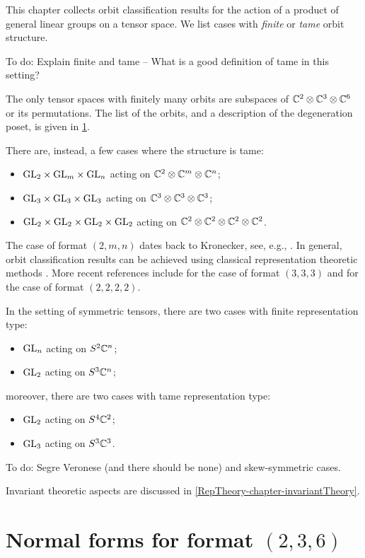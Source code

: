 This chapter collects orbit classification results for the action of a product of general linear groups on a tensor space. We list cases with \emph{finite} or \emph{tame} orbit structure.

To do: Explain finite and tame -- What is a good definition of tame in this setting?

The only tensor spaces with finitely many orbits are subspaces of $\mathbb{C}^2 \otimes \mathbb{C}^3 \otimes \mathbb{C}^6$ or its permutations. The list of the orbits, and a description of the degeneration poset, is given in \ref{RepTheory-orbitclassification-section-236}.

There are, instead, a few cases where the structure is tame:
\begin{itemize}
 \item $\mathrm{GL}_2 \times \mathrm{GL}_m \times \mathrm{GL}_n$ acting on $\mathbb{C}^2 \otimes \mathbb{C}^m \otimes \mathbb{C}^n$;
 \item $\mathrm{GL}_3 \times \mathrm{GL}_3 \times \mathrm{GL}_3$ acting on $\mathbb{C}^3 \otimes \mathbb{C}^3 \otimes \mathbb{C}^3$;
 \item $\mathrm{GL}_2 \times \mathrm{GL}_2 \times \mathrm{GL}_2 \times \mathrm{GL}_2$ acting on $\mathbb{C}^2 \otimes \mathbb{C}^2 \otimes \mathbb{C}^2 \otimes \mathbb{C}^2$.
\end{itemize}
The case of format $(2,m,n)$ dates back to Kronecker, see, e.g., \cite[Ch.XIII]{Gan59}. In general, orbit classification results can be achieved using classical representation theoretic methods \cite{Vin79}. More recent references include \cite{Nur00} for the case of format $(3,3,3)$ and \cite{CD12} for the case of format $(2,2,2,2)$.

In the setting of symmetric tensors, there are two cases with finite representation type:
\begin{itemize}
 \item $\mathrm{GL}_n$ acting on $S^2 \mathbb{C}^n$;
 \item $\mathrm{GL}_2$ acting on $S^3 \mathbb{C}^n$;
\end{itemize}
moreover, there are two cases with tame representation type:
\begin{itemize}
 \item $\mathrm{GL}_2$ acting on $S^4 \mathbb{C}^2$;
 \item $\mathrm{GL}_3$ acting on $S^3 \mathbb{C}^3$.
\end{itemize}

To do: Segre Veronese (and there should be none) and skew-symmetric cases.

Invariant theoretic aspects are discussed in \ref{RepTheory-chapter-invariantTheory}.

\section{Normal forms for format $(2,3,6)$}
\label{RepTheory-orbitclassification-section-236}

